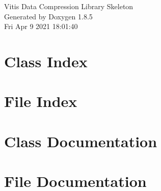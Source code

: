 \documentclass[twoside]{book}
\newcommand{\clearemptydoublepage}{%
  \newpage{\pagestyle{empty}\cleardoublepage}%
}
\begin{document}
\hypersetup{pageanchor=false}
\begin{titlepage}
\vspace*{7cm}
\begin{center}%
{\Large Vitis Data Compression Library Skeleton }\\
\vspace*{1cm}
{\large Generated by Doxygen 1.8.5}\\
\vspace*{0.5cm}
{\small Fri Apr 9 2021 18:01:40}\\
\end{center}
\end{titlepage}
\clearemptydoublepage
\tableofcontents
\clearemptydoublepage
{}
\hypersetup{pageanchor=true}

\chapter{Class Index}

\chapter{File Index}

\chapter{Class Documentation}


\chapter{File Documentation}
























\newpage
{}
{}
\printindex
\end{document}
